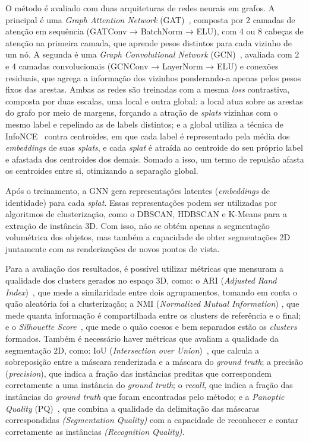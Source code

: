 O método é avaliado com duas arquiteturas de redes neurais em grafos. A principal é uma \textit{Graph Attention Network} (GAT)~\cite{velivckovic2017graph}, composta por 2 camadas de atenção em sequência (GATConv → BatchNorm → ELU), com 4 ou 8 cabeças de atenção na primeira camada, que aprende pesos distintos para cada vizinho de um nó. A segunda é uma \textit{Graph Convolutional Network} (GCN)~\cite{kipf2016semi}, avaliada com 2 e 4 camadas convolucionais (GCNConv → LayerNorm → ELU) e conexões residuais, que agrega a informação dos vizinhos ponderando-a apenas pelos pesos fixos das arestas. Ambas as redes são treinadas com a mesma \emph{loss} contrastiva, composta por duas escalas, uma local e outra global: a local atua sobre as arestas do grafo por meio de margens, forçando a atração de \emph{splats} vizinhas com o mesmo label e repelindo as de labels distintos; e a global utiliza a técnica de InfoNCE~\cite{oord2018representation} contra centroides, em que cada label é representado pela média dos \textit{embeddings} de suas \emph{splats}, e cada \emph{splat} é atraída ao centroide do seu próprio label e afastada dos centroides dos demais. Somado a isso, um termo de repulsão afasta os centroides entre si, otimizando a separação global.

Após o treinamento, a GNN gera representações latentes (\emph{embeddings} de identidade) para cada \emph{splat}. Essas representações podem ser utilizadas por algoritmos de clusterização, como o DBSCAN, HDBSCAN e K-Means para a extração de instância 3D. Com isso, não se obtém apenas a segmentação volumétrica dos objetos, mas também a capacidade de obter segmentações 2D juntamente com as renderizações de novos pontos de vista.

Para a avaliação dos resultados, é possível utilizar métricas que mensuram a qualidade dos clusters gerados no espaço 3D, como: o ARI (\textit{Adjusted Rand Index})~\cite{hubert1985comparing}, que mede a similaridade entre dois agrupamentos, tomando em conta o quão aleatória foi a clusterização; a NMI (\textit{Normalized Mutual Information}) \cite{strehl2002cluster}, que mede quanta informação é compartilhada entre os clusters de referência e o final; e o \textit{Silhouette Score}~\cite{rousseeuw1987silhouettes}, que mede o quão coesos e bem separados estão os \textit{clusters} formados. Também é necessário haver métricas que avaliam a qualidade da segmentação 2D, como: IoU (\textit{Intersection over Union})~\cite{everingham2010pascal}, que calcula a sobreposição entre a máscara renderizada e a máscara do \textit{ground truth}; a precisão (\textit{precision}), que indica a fração das instâncias preditas que correspondem corretamente a uma instância do \textit{ground truth}; o \textit{recall}, que indica a fração das instâncias do \textit{ground truth} que foram encontradas pelo método; e a \textit{Panoptic Quality} (PQ)~\cite{kirillov2019panoptic}, que combina a qualidade da delimitação das máscaras correspondidas \textit{(Segmentation Quality)} com a capacidade de reconhecer e contar corretamente as instâncias \textit{(Recognition Quality)}.


